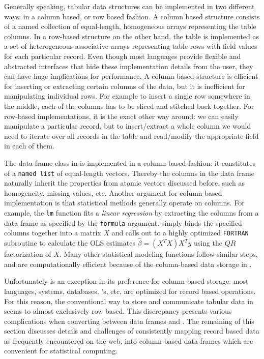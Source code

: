 Generally speaking, tabular data structures can be implemented in two different ways: in a column based, or row based fashion. A column based structure consists of a named collection of equal-length, homogeneous arrays representing the table columns. In a row-based structure on the other hand, the table is implemented as a set of heterogeneous associative arrays representing table rows with field values for each particular record. Even though most languages provide flexible and abstracted interfaces that hide these implementation details from the user, they can have huge implications for performance. A column based structure is efficient for inserting or extracting certain columns of the data, but it is inefficient for manipulating individual rows. For example to insert a single row somewhere in the middle, each of the columns has to be sliced and stitched back together. For row-based implementations, it is the exact other way around: we can easily manipulate a particular record, but to insert/extract a whole column we would need to iterate over all records in the table and read/modify the appropriate field in each of them.

The data frame class in \R is implemented in a column based fashion: it constitutes of a \texttt{named list} of equal-length vectors. Thereby the columns in the data frame naturally inherit the properties from atomic vectors discussed before, such as homogeneity, missing values, etc. Another argument for column-based implementation is that statistical methods generally operate on columns. For example, the \texttt{lm} function fits a \emph{linear regression} by extracting the columns from a data frame as specified by the \texttt{formula} argument. \R simply binds the specified columns together into a matrix $X$ and calls out to a highly optimized \texttt{FORTRAN} subroutine to calculate the OLS estimates $\hat{\beta} = (X^TX)X^Ty$ using the $QR$ factorization of $X$. Many other statistical modeling functions follow similar steps, and are computationally efficient because of the column-based data storage in \R.  

Unfortunately \R is an exception in its preference for column-based storage: most languages, systems, databases, \API's, etc, are optimized for record based operations. For this reason, the conventional way to store and communicate tabular data in \JSON seems to almost exclusively row based. This discrepancy presents various complications when converting between data frames and \JSON. The remaining of this section discusses details and challenges of consistently mapping record based \JSON data as frequently encountered on the web, into column-based data frames which are convenient for statistical computing.

